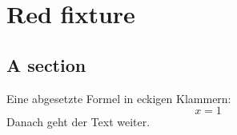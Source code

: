 \chapter{Red fixture}\label{c98}

\section{A section}\label{c98.s1}

Eine abgesetzte Formel in eckigen Klammern:
\[ x = 1 \]
Danach geht der Text weiter.
